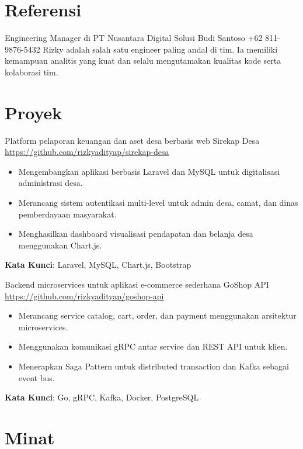 \documentclass[a4paper, serif, 10pt]{moderncv}
\begin{document}
\section{Referensi}

        {Engineering Manager di PT Nusantara Digital Solusi}
        {Budi Santoso}
        {+62 811-9876-5432}
        {}
        {Rizky adalah salah satu engineer paling andal di tim. Ia memiliki kemampuan analitis yang kuat dan selalu mengutamakan kualitas kode serta kolaborasi tim.}
\section{Proyek}

        {Platform pelaporan keuangan dan aset desa berbasis web}
        {Sirekap Desa}
        {\url{https://github.com/rizkyadityap/sirekap-desa}}
        {}
        {\begin{itemize}
\item Mengembangkan aplikasi berbasis Laravel dan MySQL untuk digitalisasi administrasi desa.
\item Merancang sistem autentikasi multi-level untuk admin desa, camat, dan dinas pemberdayaan masyarakat.
\item Menghasilkan dashboard visualisasi pendapatan dan belanja desa menggunakan Chart.js.
\end{itemize}
\textbf{Kata Kunci}: Laravel, MySQL, Chart.js, Bootstrap}

        {Backend microservices untuk aplikasi e-commerce sederhana}
        {GoShop API}
        {\url{https://github.com/rizkyadityap/goshop-api}}
        {}
        {\begin{itemize}
\item Merancang service catalog, cart, order, dan payment menggunakan arsitektur microservices.
\item Menggunakan komunikasi gRPC antar service dan REST API untuk klien.
\item Menerapkan Saga Pattern untuk distributed transaction dan Kafka sebagai event bus.
\end{itemize}
\textbf{Kata Kunci}: Go, gRPC, Kafka, Docker, PostgreSQL}
\section{Minat}
\end{document}
